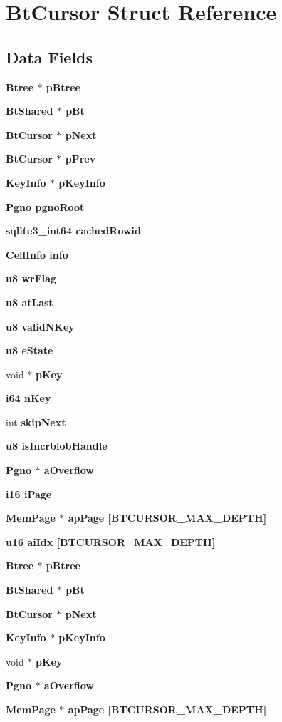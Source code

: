 \section{Bt\-Cursor Struct Reference}
\label{structBtCursor}
\subsection*{Data Fields}
\begin{CompactItemize}
\item 
\bf{Btree} $\ast$ \bf{p\-Btree}
\item 
\bf{Bt\-Shared} $\ast$ \bf{p\-Bt}
\item 
\bf{Bt\-Cursor} $\ast$ \bf{p\-Next}
\item 
\bf{Bt\-Cursor} $\ast$ \bf{p\-Prev}
\item 
\bf{Key\-Info} $\ast$ \bf{p\-Key\-Info}
\item 
\bf{Pgno} \bf{pgno\-Root}
\item 
\bf{sqlite3\_\-int64} \bf{cached\-Rowid}
\item 
\bf{Cell\-Info} \bf{info}
\item 
\bf{u8} \bf{wr\-Flag}
\item 
\bf{u8} \bf{at\-Last}
\item 
\bf{u8} \bf{valid\-NKey}
\item 
\bf{u8} \bf{e\-State}
\item 
void $\ast$ \bf{p\-Key}
\item 
\bf{i64} \bf{n\-Key}
\item 
int \bf{skip\-Next}
\item 
\bf{u8} \bf{is\-Incrblob\-Handle}
\item 
\bf{Pgno} $\ast$ \bf{a\-Overflow}
\item 
\bf{i16} \bf{i\-Page}
\item 
\bf{Mem\-Page} $\ast$ \bf{ap\-Page} [BTCURSOR\_\-MAX\_\-DEPTH]
\item 
\bf{u16} \bf{ai\-Idx} [BTCURSOR\_\-MAX\_\-DEPTH]
\item 
\bf{Btree} $\ast$ \bf{p\-Btree}
\item 
\bf{Bt\-Shared} $\ast$ \bf{p\-Bt}
\item 
\bf{Bt\-Cursor} $\ast$ \bf{p\-Next}
\item 
\bf{Key\-Info} $\ast$ \bf{p\-Key\-Info}
\item 
void $\ast$ \bf{p\-Key}
\item 
\bf{Pgno} $\ast$ \bf{a\-Overflow}
\item 
\bf{Mem\-Page} $\ast$ \bf{ap\-Page} [BTCURSOR\_\-MAX\_\-DEPTH]
\end{CompactItemize}


